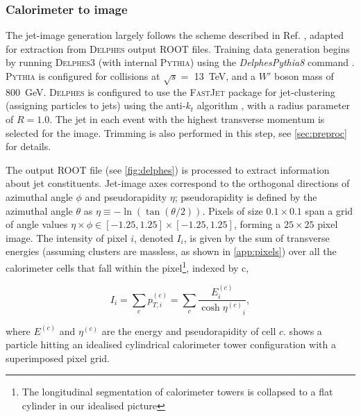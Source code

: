 \documentclass[twocolumn]{article}
\newcommand{\pkg}[1]{\textsc{#1}}
\begin{document}
\subsubsection{Calorimeter to image}
The jet-image generation largely follows the scheme described in Ref. \cite{de2015jet}, adapted for extraction from \pkg{Delphes} output \pkg{ROOT} files. Training data generation begins by running \pkg{Delphes}3 (with internal \pkg{Pythia}) using the \textit{DelphesPythia8} command \cite{workbook}. \pkg{Pythia} is configured for collisions at $\sqrt{s} =$ \SI{13}{\tera\electronvolt}, and a $W'$ boson mass of \SI{800}{\giga\electronvolt}. \pkg{Delphes} is configured to use the \pkg{FastJet} \cite{fastjet} package for jet-clustering (assigning particles to jets) using the anti-$k_t$ algorithm \cite{antikt}, with a radius parameter of $R=1.0$. The jet in each event with the highest transverse momentum is selected for the image. Trimming is also performed in this step, see \cref{sec:preproc} for details.

The output \pkg{ROOT} file (see \cref{fig:delphes}) is processed to extract information about jet constituents. Jet-image axes correspond to the orthogonal directions of azimuthal angle $\phi$ and pseudorapidity $\eta$; pseudorapidity is defined by the azimuthal angle $\theta$ as $\eta \equiv -\ln(\tan(\theta/2))$. Pixels of size $0.1 \times 0.1$ span a grid of angle values $\eta \times \phi \in [-1.25, 1.25]\times [-1.25, 1.25]$, forming a $25\times 25$ pixel image. The intensity of pixel $i$, denoted $I_i$, is given by the sum of transverse energies (assuming clusters are massless, as shown in \cref{app:pixels}) over all the calorimeter cells that fall within the pixel\footnote{The longitudinal segmentation of calorimeter towers is collapsed to a flat cylinder in our idealised picture}, indexed by c, 

\begin{equation}
I_i = \sum_c p_{T, i}^{(c)} = \sum_c\frac{E^{(c)}_i}{\cosh{\eta^{(c)}}_i} ,
\label{eq:intensity}
\end{equation}

where $E^{(c)}$ and $\eta^{(c)}$ are the energy and pseudorapidity of cell $c$.  shows a particle hitting an idealised cylindrical calorimeter tower configuration with a superimposed pixel grid.

%	
%	
\end{document}
